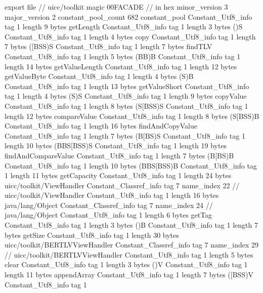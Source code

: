 export file {		// uicc/toolkit
	magic	00FACADE		 // in hex
	minor_version	3
	major_version	2
	constant_pool_count	682
	constant_pool {
		Constant_Utf8_info {
			tag	1
			length	9
			bytes	getLength
		}
		Constant_Utf8_info {
			tag	1
			length	3
			bytes	()S
		}
		Constant_Utf8_info {
			tag	1
			length	4
			bytes	copy
		}
		Constant_Utf8_info {
			tag	1
			length	7
			bytes	([BSS)S
		}
		Constant_Utf8_info {
			tag	1
			length	7
			bytes	findTLV
		}
		Constant_Utf8_info {
			tag	1
			length	5
			bytes	(BB)B
		}
		Constant_Utf8_info {
			tag	1
			length	14
			bytes	getValueLength
		}
		Constant_Utf8_info {
			tag	1
			length	12
			bytes	getValueByte
		}
		Constant_Utf8_info {
			tag	1
			length	4
			bytes	(S)B
		}
		Constant_Utf8_info {
			tag	1
			length	13
			bytes	getValueShort
		}
		Constant_Utf8_info {
			tag	1
			length	4
			bytes	(S)S
		}
		Constant_Utf8_info {
			tag	1
			length	9
			bytes	copyValue
		}
		Constant_Utf8_info {
			tag	1
			length	8
			bytes	(S[BSS)S
		}
		Constant_Utf8_info {
			tag	1
			length	12
			bytes	compareValue
		}
		Constant_Utf8_info {
			tag	1
			length	8
			bytes	(S[BSS)B
		}
		Constant_Utf8_info {
			tag	1
			length	16
			bytes	findAndCopyValue
		}
		Constant_Utf8_info {
			tag	1
			length	7
			bytes	(B[BS)S
		}
		Constant_Utf8_info {
			tag	1
			length	10
			bytes	(BBS[BSS)S
		}
		Constant_Utf8_info {
			tag	1
			length	19
			bytes	findAndCompareValue
		}
		Constant_Utf8_info {
			tag	1
			length	7
			bytes	(B[BS)B
		}
		Constant_Utf8_info {
			tag	1
			length	10
			bytes	(BBS[BSS)B
		}
		Constant_Utf8_info {
			tag	1
			length	11
			bytes	getCapacity
		}
		Constant_Utf8_info {
			tag	1
			length	24
			bytes	uicc/toolkit/ViewHandler
		}
		Constant_Classref_info {
			tag	7
			name_index	22		// uicc/toolkit/ViewHandler
		}
		Constant_Utf8_info {
			tag	1
			length	16
			bytes	java/lang/Object
		}
		Constant_Classref_info {
			tag	7
			name_index	24		// java/lang/Object
		}
		Constant_Utf8_info {
			tag	1
			length	6
			bytes	getTag
		}
		Constant_Utf8_info {
			tag	1
			length	3
			bytes	()B
		}
		Constant_Utf8_info {
			tag	1
			length	7
			bytes	getSize
		}
		Constant_Utf8_info {
			tag	1
			length	30
			bytes	uicc/toolkit/BERTLVViewHandler
		}
		Constant_Classref_info {
			tag	7
			name_index	29		// uicc/toolkit/BERTLVViewHandler
		}
		Constant_Utf8_info {
			tag	1
			length	5
			bytes	clear
		}
		Constant_Utf8_info {
			tag	1
			length	3
			bytes	()V
		}
		Constant_Utf8_info {
			tag	1
			length	11
			bytes	appendArray
		}
		Constant_Utf8_info {
			tag	1
			length	7
			bytes	([BSS)V
		}
		Constant_Utf8_info {
			tag	1
}}}
